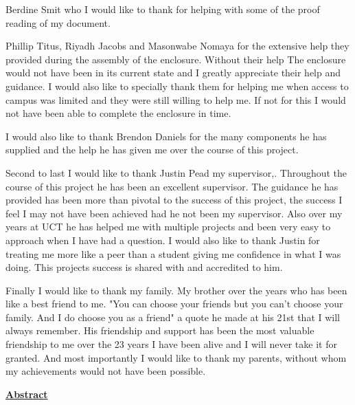 \documentclass[a4paper,11pt]{article}
\numberwithin{figure}{section}
\numberwithin{table}{section}
\begin{document}
	Berdine Smit who I would like to thank for helping with some of the proof reading of my document. %
	
	Phillip Titus, Riyadh Jacobs and Masonwabe Nomaya for the extensive help they provided during the assembly of the enclosure. Without their help The enclosure would not have been in its current state and I greatly appreciate their help and guidance. I would also like to specially thank them for helping me when access to campus was limited and they were still willing to help me. If not for this I would not have been able to complete the enclosure in time.
	
	I would also like to thank Brendon Daniels for the many components he has supplied and the help he has given me over the course of this project.
	
Second to last I would like to thank Justin Pead my supervisor,. Throughout the course of this project he has been an excellent supervisor. The guidance he has provided has been more than pivotal to the success of this project, the success I feel I may not have been achieved had he not been my supervisor. Also over my years at UCT he has helped me with multiple projects and been very easy to approach when I have had a question. I would also like to thank Justin for treating me more like a peer than a student giving me confidence in what I was doing. This projects success is shared with and accredited to him.

Finally I would like to thank my family. My brother over the years who has been like a best friend to me. "You can choose your friends but you can't choose your family. And I do choose you as a friend" a quote he made at his 21st that I will always remember. His friendship and support has been the most valuable friendship to me over the 23 years I have been alive and I will never take it for granted. And most importantly I would like to thank my parents, without whom my achievements would not have been possible.
	\newpage
	
	{\centering\Huge\bfseries\underline{Abstract}\par}
	\newpage	
	\tableofcontents
	\newpage
	\listoffigures
	\newpage
	\listoftables
	\newpage
	
\end{document}
